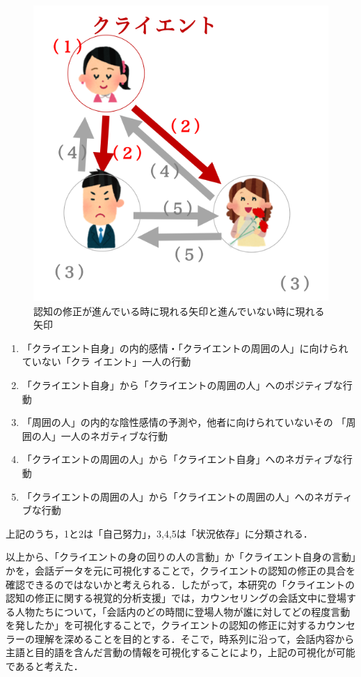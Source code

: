 \documentclass[shuuron]{kuee}
\begin{document}
\begin{figure}
  \begin{center}
    \includegraphics[width=\linewidth]{arrow.png}
  \end{center}
  \caption{認知の修正が進んでいる時に現れる矢印と進んでいない時に現れる矢印}
  \label{fig:arrow}
\end{figure}

\begin{enumerate}
  \item 「クライエント自身」の内的感情・「クライエントの周囲の人」に向けられていない「クラ
  イエント」一人の行動
  \item 「クライエント自身」から「クライエントの周囲の人」へのポジティブな行動


  \item 「周囲の人」の内的な陰性感情の予測や，他者に向けられていないその
  「周囲の人」一人のネガティブな行動
  \item 「クライエントの周囲の人」から「クライエント自身」へのネガティブな行動
  \item 「クライエントの周囲の人」から「クライエントの周囲の人」へのネガティブな行動

\end{enumerate}
上記のうち，1と2は「自己努力」，3,4,5は「状況依存」に分類される．

以上から、「クライエントの身の回りの人の言動」か「クライエント自身の言動」かを，会話データを元に可視化することで，クライエントの認知の修正の具合を確認できるのではないかと考えられる．したがって，本研究の「クライエントの認知の修正に関する視覚的分析支援」では，カウンセリングの会話文中に登場する人物たちについて，「会話内のどの時間に登場人物が誰に対してどの程度言動を発したか」を可視化することで，クライエントの認知の修正に対するカウンセラーの理解を深めることを目的とする．そこで，時系列に沿って，会話内容から主語と目的語を含んだ言動の情報を可視化することにより，上記の可視化が可能であると考えた．
\end{document}
